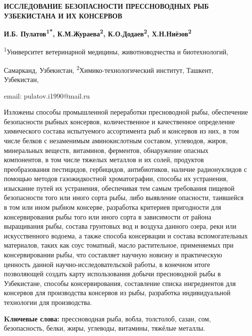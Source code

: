 \begin{center}
{\large\bfseries ИССЛЕДОВАНИЕ БЕЗОПАСНОСТИ ПРЕССНОВОДНЫХ РЫБ УЗБЕКИСТАНА И ИХ КОНСЕРВОВ}

\vspace{1em}
{\bfseries И.Б. Пулатов\textsuperscript{1*},
К.М.Жураева\textsuperscript{2}, К.О.Додаев\textsuperscript{2},
Х.Н.Ниёзов\textsuperscript{2}}

\textsuperscript{1}Университет ветеринарной медицины, животноводчества и
биотехнологий,

Самарканд, Узбекистан, \textsuperscript{2}Химико-технологический
институт, Ташкент, Узбекистан,

email: pulatov.i1990@mail.ru
\end{center}

\hspace{1.5em} Изложены способы промышленной переработки пресноводной рыбы, обеспечение
безопасности рыбных консервов, количественное и качественное определение
химического состава испытуемого ассортимента рыб и консервов из них, в
том числе белков с незаменимым аминокислотным составом, углеводов,
жиров, минеральных веществ, витаминов, ферментов, обнаружение опасных
компонентов, в том числе тяжелых металлов и их солей, продуктов
преобразования пестицидов, гербицидов, антибиотиков, наличие
радионуклидов с помощью методов газожидкостной хроматографии, способы их
устранения, изыскание путей их устранения, обеспечивая тем самым
требования пищевой безопасности того или иного сорта рыбы, либо
выявление опасности, таившейся в том или ином рыбном консерве,
разработка критериев пригодности для консервирования рыбы того или иного
сорта в зависимости от района выращивания рыбы, состава грунтовых вод и
воздуха данного озера, реки или искусственного водоема, а также способа
консервации и состава вспомогательных материалов, таких как соус
томатный, масло растительное, применяемых при консервировании рыбы, что
составляет научную новизну и практическую ценность данной
научно-исследовательской работы, в конечном итоге позволяющей создать
карту использования добычи пресноводной рыбы в Узбекистане, способы
консервирования, составление списка ингредиентов для консервов для
производства консервов из рыбы, разработка индивидуальной технологии для
производства.

\hspace{1.5em} {\bfseries Kлючевые слова:} прессноводная рыба, вобла, толстолоб, сазан,
сом, безопасность, белки, жиры, углеводы, витамины, тяжёлые металлы.

\vspace{1em}

